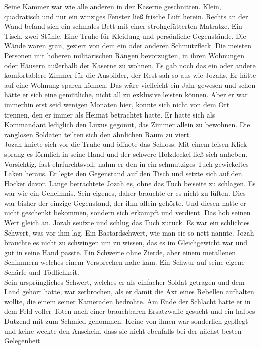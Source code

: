 Seine Kammer war wie alle anderen in der Kaserne geschnitten. Klein, quadratisch und nur ein 
winziges Fenster ließ frische Luft herein. Rechts an der Wand befand sich ein schmales Bett mit 
einer strohgefütterten Matratze. Ein Tisch, zwei Stühle. Eine Truhe für Kleidung und persönliche 
Gegenstände. Die Wände waren grau, geziert von dem ein oder anderen Schmutzfleck. Die meisten 
Personen mit höheren militärischen Rängen bevorzugten, in ihren Wohnungen oder Häusern außerhalb 
der Kaserne zu wohnen. Es gab noch das ein oder andere komfortablere Zimmer für die Ausbilder, der 
Rest sah so aus wie Jozahs. Er hätte auf eine Wohnung sparen können. Das wäre vielleicht ein Jahr 
gewesen und schon hätte er sich eine gemütliche, nicht all zu exklusive leisten können. Aber er war 
immerhin erst seid wenigen Monaten hier, konnte sich nicht von dem Ort trennen, den er immer als 
Heimat betrachtet hatte. Er hatte sich als Kommandant lediglich den Luxus gegönnt, das Zimmer 
allein zu bewohnen. Die ranglosen Soldaten teilten sich den ähnlichen Raum zu viert. \\
Jozah kniete sich vor die Truhe und öffnete das Schloss. Mit einem leisen Klick sprang es förmlich 
in seine Hand und der schwere Holzdeckel ließ sich anheben. Vorsichtig, fast ehrfurchtsvoll, nahm 
er den in ein schmutziges Tuch gewickeltes Laken heraus. Er legte den Gegenstand auf den Tisch und 
setzte sich auf den Hocker davor. Lange betrachtete Jozah es, ohne das Tuch beiseite zu schlagen. 
Es war wie ein Geheimnis. Sein eigenes, daher brauchte er es nicht zu lüften. Dies war bisher der 
einzige Gegenstand, der ihm allein gehörte. Und diesen hatte er nicht geschenkt bekommen, sondern 
sich erkämpft und verdient. Das hob seinen Wert gleich an. Jozah seufzte und schlug das Tuch zurück. 
Es war ein schlichtes Schwert, was vor ihm lag. Ein Bastardschwert, wie man sie so nett nannte. 
Jozah brauchte es nicht zu schwingen um zu wissen, das es im Gleichgewicht war und gut in seine 
Hand passte. Ein Schwerte ohne Zierde, aber einem metallenen Schimmern welches einem Versprechen 
nahe kam. Ein Schwur auf seine eigene Schärfe und Tödlichkeit. \\
Sein ursprüngliches Schwert, welches er als einfacher Soldat getragen und dem Land gehört 
hatte, war zerbrochen, als er damit die Axt eines Rebellen aufhalten wollte, die einem seiner 
Kameraden bedrohte. Am Ende der Schlacht hatte er in dem Feld voller Toten nach einer brauchbaren 
Ersatzwaffe gesucht und ein halbes Dutzend mit zum Schmied genommen. Keine von ihnen war sonderlich 
gepflegt und keine weckte den Anschein, dass sie nicht ebenfalls bei der nächst besten Gelegenheit 
